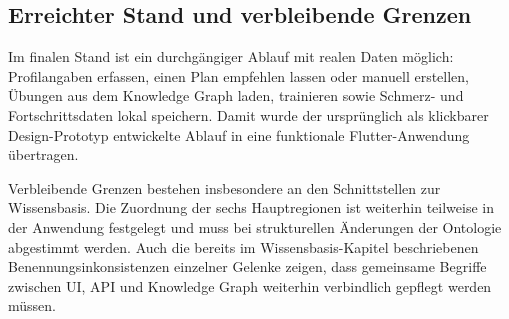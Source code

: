 \subsection{Erreichter Stand und verbleibende Grenzen}

Im finalen Stand ist ein durchgängiger Ablauf mit realen Daten möglich: Profilangaben erfassen, einen Plan empfehlen lassen oder manuell erstellen, Übungen aus dem Knowledge Graph laden, trainieren sowie Schmerz- und Fortschrittsdaten lokal speichern. Damit wurde der ursprünglich als klickbarer Design-Prototyp entwickelte Ablauf in eine funktionale Flutter-Anwendung übertragen.

Verbleibende Grenzen bestehen insbesondere an den Schnittstellen zur Wissensbasis. Die Zuordnung der sechs Hauptregionen ist weiterhin teilweise in der Anwendung festgelegt und muss bei strukturellen Änderungen der Ontologie abgestimmt werden. Auch die bereits im Wissensbasis-Kapitel beschriebenen Benennungsinkonsistenzen einzelner Gelenke zeigen, dass gemeinsame Begriffe zwischen UI, API und Knowledge Graph weiterhin verbindlich gepflegt werden müssen.
